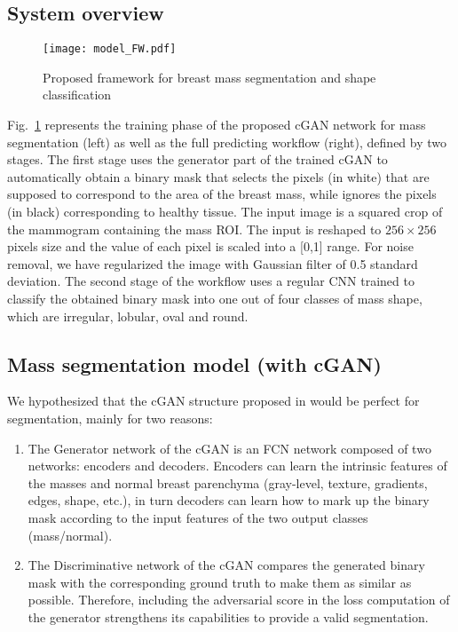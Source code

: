 \documentclass[runningheads,a4paper]{llncs}
\begin{document}
\subsection{System overview}
\begin{figure}[!h]
\centering
\texttt{[image: model\_FW.pdf]}
\caption{Proposed framework for breast mass segmentation and shape classification}
\label{fig1:model}
\end{figure}


Fig.~\ref{fig1:model} represents the training phase of the proposed cGAN network for mass segmentation (left) as well as the full predicting workflow (right), defined by two stages. The first stage uses the generator part of the trained cGAN to automatically obtain a binary mask that selects the pixels (in white) that are supposed to correspond to the area of the breast mass, while ignores the pixels (in black) corresponding to healthy tissue. The input image is a squared crop of the mammogram containing the mass ROI. The input is reshaped to $256\times 256$ pixels size and the value of each pixel is scaled into a [0,1] range. For noise removal, we have regularized the image with Gaussian filter of 0.5 standard deviation. The second stage of the workflow uses a regular CNN trained to classify the obtained binary mask into one out of four classes of mass shape, which are irregular, lobular, oval and round.



\subsection{Mass segmentation model (with cGAN)}

We hypothesized that the cGAN structure proposed in \cite{isola2017image} would be perfect for segmentation, mainly for two reasons:

\begin{enumerate}
  \item The Generator network of the cGAN is an FCN network composed of two networks: encoders and decoders. Encoders can learn the intrinsic features of the masses and normal breast parenchyma (gray-level, texture, gradients, edges, shape, etc.), in turn decoders can learn how to mark up the binary mask according to the input features of the two output classes (mass/normal).
  \item The Discriminative network of the cGAN compares the generated binary mask with the corresponding ground truth to make them as similar as possible. Therefore, including the adversarial score in the loss computation of the generator strengthens its capabilities to provide a valid segmentation.
\end{enumerate}
\end{document}
